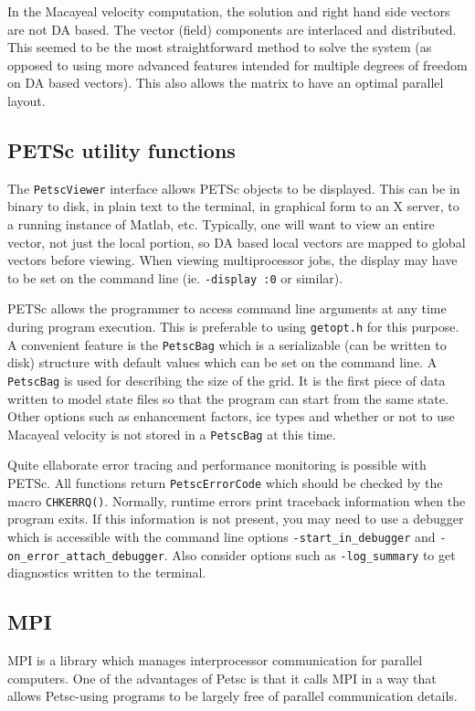 \documentclass[11pt,final]{amsart}
\renewcommand{\t}[1]{\texttt{#1}}
\begin{document}
In the Macayeal velocity computation, the solution and right hand side vectors are not DA
based. The vector (field) components are interlaced and distributed. This seemed to be the
most straightforward method to solve the system (as opposed to using more advanced
features intended for multiple degrees of freedom on DA based vectors). This also allows
the matrix to have an optimal parallel layout.

\subsection{PETSc utility functions}
The \t{PetscViewer} interface allows PETSc objects to be displayed. This can be in binary
to disk, in plain text to the terminal, in graphical form to an X server, to a running
instance of Matlab, etc. Typically, one will want to view an entire vector, not just the
local portion, so DA based local vectors are mapped to global vectors before viewing. When
viewing multiprocessor jobs, the display may have to be set on the command line (ie.
\t{-display :0} or similar).

PETSc allows the programmer to access command line arguments at any time during program
execution. This is preferable to using \t{getopt.h} for this purpose. A convenient feature
is the \t{PetscBag} which is a serializable (can be written to disk) structure with
default values which can be set on the command line. A \t{PetscBag} is used for describing
the size of the grid. It is the first piece of data written to model state files so that
the program can start from the same state. Other options such as enhancement factors, ice
types and whether or not to use Macayeal velocity is not stored in a \t{PetscBag} at this
time.

Quite ellaborate error tracing and performance monitoring is possible with PETSc. All
functions return \t{PetscErrorCode} which should be checked by the macro \t{CHKERRQ()}.
Normally, runtime errors print traceback information when the program exits. If this
information is not present, you may need to use a debugger which is accessible with the
command line options \verb|-start_in_debugger| and \verb|-on_error_attach_debugger|. Also
consider options such as \verb|-log_summary| to get diagnostics written to the terminal.

\subsection{MPI}  MPI is a library which manages interprocessor communication for parallel computers.  One of the advantages of Petsc is that it calls MPI in a way that allows Petsc-using programs to be largely free of parallel communication details.




\end{document}
